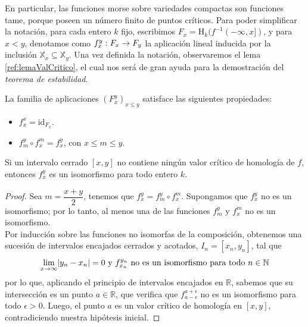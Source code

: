 \begin{sloppypar}
En particular, las funciones morse sobre variedades compactas son funciones tame, porque poseen un número finito de puntos críticos. Para poder simplificar la notación, para cada entero $k$ fijo, escribimos ${F_x = \text{H}_k(f^{-1}(-\infty, x])}$, y para $x < y$, denotamos como ${\tensor*{f}{*^{y}_{x}}: F_x \to F_y}$ la aplicación lineal inducida por la inclusión $\mathbb{X}_{x} \subseteq \mathbb{X}_{y}$. Una vez definida la notación, observaremos el lema \ref{ref:lemaValCritico}, el cual nos será de gran ayuda para la demostración del \emph{teorema de estabilidad}.
\end{sloppypar}

\begin{property}
La familia de aplicaciones $(F_{x}^{y})_{x \leq y}$ satisface las siguientes propiedades:
\begin{itemize}
	\item $f_{x}^{x}= \text{id}_{F_x}$.
	\item $f_{m}^{y} \circ f_{x}^{m} = f_{x}^{y}$, con $x \leq m \leq y$.
\end{itemize}
\end{property}


\begin{lemma}
\label{ref:lemaValCritico}
Si un intervalo cerrado $[x, y]$ no contiene ningún valor crítico de homología de $f$, entonces $f_{x}^{y}$ es un isomorfismo para todo entero $k$.
\end{lemma}

\begin{proof}
Sea $m = \dfrac{x+y}{2}$, tenemos que $f_{x}^{y}=f_{m}^{y} \circ f_{x}^{m}$. Supongamos que $f_{x}^{y}$ no es un isomorfismo; por lo tanto, al menos una de las funciones $f_{m}^{y}$ y $f_{x}^{m}$ no es un isomorfismo.\\
Por inducción sobre las funciones no isomorfas de la composición, obtenemos una sucesión de intervalos encajados cerrados y acotados, $I_n=[x_n,y_n]$, tal que
\[
\lim_{x\to\infty} \lvert y_n - x_n\rvert = 0 \text{ y } f_{x_n}^{y_n} \text{ no es un isomorfismo para todo  } n \in \mathbb{N}
\]
por lo que, aplicando el principio de intervalos encajados en $\mathbb{R}$, sabemos que su intersección es un punto $a \in \mathbb{R}$, que verifica que $f_{a-\epsilon}^{a+\epsilon}$ no es un isomorfismo para todo $\epsilon > 0$. Luego, el punto $a$ es un valor crítico de homología en $[x, y]$, contradiciendo nuestra hipótesis inicial.
\end{proof}

